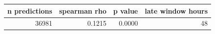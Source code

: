 \begin{tabular}{rrrr}
\toprule
n predictions & spearman rho & p value & late window hours \\
\midrule
36981 & 0.1215 & 0.0000 & 48 \\
\bottomrule
\end{tabular}
